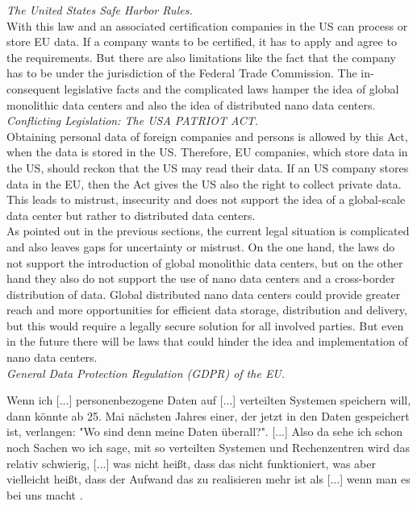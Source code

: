 \textit{The United States Safe Harbor Rules.}\\
With this law and an associated certification companies in the US can process or store EU data. If a company wants to be certified, it has to apply and agree to the requirements. But there are also limitations like the fact that the company has to be under the jurisdiction of the Federal Trade Commission. The in-consequent legislative facts and the complicated laws hamper the idea of global monolithic data centers and also the idea of distributed nano data centers. \cite{locmat}\\

\textit{Conflicting Legislation: The USA PATRIOT ACT.}\\
Obtaining personal data of foreign companies and persons is allowed by this Act, when the data is stored in the US. Therefore, EU companies, which store data in the US, should reckon that the US may read their data. If an US company stores data in the EU, then the Act gives the US also the right to collect private data. This leads to mistrust, insecurity and does not support the idea of a global-scale data center but rather to distributed data centers. \cite{locmat}\\

As pointed out in the previous sections, the current legal situation is complicated and also leaves gaps for uncertainty or mistrust. On the one hand, the laws do not support the introduction of global monolithic data centers, but on the other hand they also do not support the use of nano data centers and a cross-border distribution of data. Global distributed nano data centers could provide greater reach and more opportunities for efficient data storage, distribution and delivery, but this would require a legally secure solution for all involved parties. But even in the future there will be laws that could hinder the idea and implementation of nano data centers.\\


\textit{General Data Protection Regulation (GDPR) of the EU.}
\begin{displayquote}
Wenn ich [...] personenbezogene Daten auf [...] verteilten Systemen speichern will, dann könnte ab 25. Mai nächsten Jahres einer, der jetzt in den Daten gespeichert ist, verlangen: "Wo sind denn meine Daten überall?". [...] Also da sehe ich schon noch Sachen wo ich sage, mit so verteilten Systemen und Rechenzentren wird das relativ schwierig, [...] was nicht heißt, dass das nicht funktioniert, was aber vielleicht heißt, dass der Aufwand das zu realisieren mehr ist als [...] wenn man es bei uns macht \cite{kranzlm}.
\end{displayquote}

